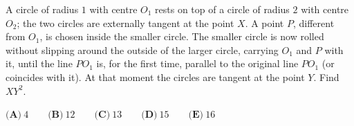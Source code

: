 A circle of radius $1$ with centre $O_1$ rests on top of a circle of radius $2$ with centre $O_2$; the two circles are externally tangent at the point $X$. A point $P$, different from $O_1$, is chosen inside the smaller circle. The smaller circle is now rolled without slipping around the outside of the larger circle, carrying $O_1$ and $P$ with it, until the line $PO_1$ is, for the first time, parallel to the original line $PO_1$ (or coincides with it). At that moment the circles are tangent at the point $Y$. Find $XY^2$.

$\textbf{(A)}\ 4\qquad\textbf{(B)}\ 12\qquad\textbf{(C)}\ 13\qquad\textbf{(D)}\ 15\qquad\textbf{(E)}\ 16$
